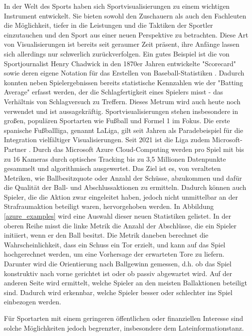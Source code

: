 \documentclass[
  ngerman,
  a4paper,  %
  twoside,  %
  bibliography=totoc,
  headsepline,
  cleardoublepage=empty,
  parskip=half,
  draft=false
]{scrbook}
\begin{document}
In der Welt des Sports haben sich Sportvisualisierungen zu einem wichtigen Instrument entwickelt.
Sie bieten sowohl den Zuschauern als auch den Fachleuten die Möglichkeit, tiefer in die Leistungen und die Taktiken der Sportler einzutauchen und den Sport aus einer neuen Perspektive zu betrachten.
Diese Art von Visualisierungen ist bereits seit geraumer Zeit präsent, ihre Anfänge lassen sich allerdings nur schwerlich zurückverfolgen.
Ein gutes Beispiel ist die von Sportjournalist Henry Chadwick in den 1870er Jahren entwickelte "Scorecard" sowie deren eigene Notation für das Erstellen von Baseball-Statistiken \cite{scorecard}.
Dadurch konnten neben Spielergebnissen bereits statistische Kennzahlen wie der "Batting Average" erfasst werden, der die Schlagfertigkeit eines Spielers misst - das Verhältnis von Schlagversuch zu Treffern.
Dieses Metrum wird auch heute noch verwendet und ist aussagekräftig.
Sportvisualisierungen stehen insbesondere in großen, populären Sportarten wie Fußball und Formel 1 im Fokus.
Die erste spanische Fußballliga, genannt LaLiga, gilt seit Jahren als Paradebeispiel für die Integration vielfältiger Visualisierungen.
Seit 2021 ist die Liga zudem Microsoft-Partner \cite{microsoftazure}.
Durch das Microsoft Azure Cloud-Computing werden pro Spiel mit bis zu 16 Kameras durch optisches Tracking bis zu 3,5 Millionen Datenpunkte gesammelt und algorithmisch ausgewertet.
Das Ziel ist es, von veralteten Metriken, wie Ballbesitzquote oder Anzahl der Schüsse, abzukommen und dafür die Qualität der Ball- und Abschlussaktionen zu ermitteln.
Dadurch können auch Spieler, die die Aktion zwar eingeleitet haben, jedoch nicht unmittelbar an der Strafraumaktion beteiligt waren, hervorgehoben werden.
In Abbildung \ref{azure_examples} wird eine Auswahl dieser neuen Statistiken gelistet. In der oberen Reihe misst die linke Metrik die Anzahl der Abschlüsse, die ein Spieler initiiert, wenn er den Ball besitzt.
Die Metrik daneben berechnet die Wahrscheinlichkeit, dass ein Schuss ein Tor erzielt, und kann auf das Spiel hochgerechnet werden, um eine Vorhersage der erwarteten Tore zu liefern.
Darunter wird die Orientierung nach Ballgewinn gemessen, d.h. ob das Spiel konstruktiv nach vorne gerichtet ist oder ob passiv abgewartet wird.
Auf der anderen Seite wird ermittelt, welche Spieler an den meisten Ballaktionen beteiligt sind.
Dadurch wird erkennbar, welche Spieler besser oder schlechter ins Spiel einbezogen werden.

Für Sportarten mit einem geringeren öffentlichen oder finanziellen Interesse sind solche Möglichkeiten jedoch begrenzter, insbesondere dem Lateinformationstanz.
\end{document}
